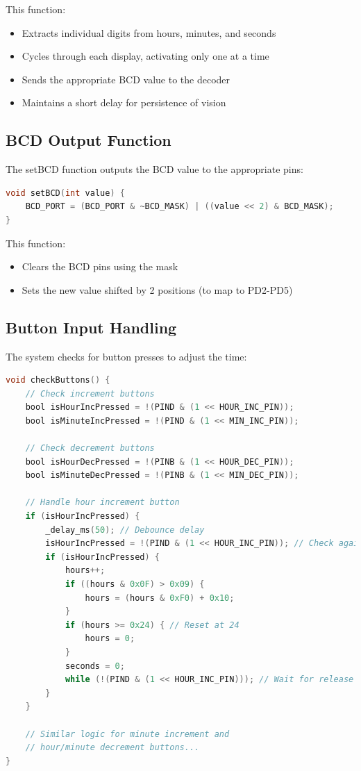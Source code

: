 \documentclass[12pt]{article}
\begin{document}
This function:
\begin{itemize}
    \item Extracts individual digits from hours, minutes, and seconds
    \item Cycles through each display, activating only one at a time
    \item Sends the appropriate BCD value to the decoder
    \item Maintains a short delay for persistence of vision
\end{itemize}

\subsection{BCD Output Function}

The setBCD function outputs the BCD value to the appropriate pins:

\begin{lstlisting}[language=C, caption=BCD Value Output]
void setBCD(int value) {
    BCD_PORT = (BCD_PORT & ~BCD_MASK) | ((value << 2) & BCD_MASK);
}
\end{lstlisting}

This function:
\begin{itemize}
    \item Clears the BCD pins using the mask
    \item Sets the new value shifted by 2 positions (to map to PD2-PD5)
\end{itemize}

\subsection{Button Input Handling}

The system checks for button presses to adjust the time:

\begin{lstlisting}[language=C, caption=Button Input Handling]
void checkButtons() {
    // Check increment buttons
    bool isHourIncPressed = !(PIND & (1 << HOUR_INC_PIN));
    bool isMinuteIncPressed = !(PIND & (1 << MIN_INC_PIN));
    
    // Check decrement buttons
    bool isHourDecPressed = !(PINB & (1 << HOUR_DEC_PIN));
    bool isMinuteDecPressed = !(PINB & (1 << MIN_DEC_PIN));

    // Handle hour increment button
    if (isHourIncPressed) {
        _delay_ms(50); // Debounce delay
        isHourIncPressed = !(PIND & (1 << HOUR_INC_PIN)); // Check again
        if (isHourIncPressed) {
            hours++;
            if ((hours & 0x0F) > 0x09) {
                hours = (hours & 0xF0) + 0x10;
            }
            if (hours >= 0x24) { // Reset at 24
                hours = 0;
            }
            seconds = 0;
            while (!(PIND & (1 << HOUR_INC_PIN))); // Wait for release
        }
    }

    // Similar logic for minute increment and 
    // hour/minute decrement buttons...
}
\end{lstlisting}
\end{document}

